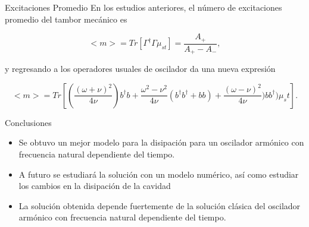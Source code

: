 \documentclass[10pt]{beamer}
\begin{document}
\begin{frame}{Excitaciones Promedio}
En los estudios anteriores, el número de excitaciones promedio del tambor mecánico es

\begin{equation*}
<m> = Tr[\Gamma^\dagger \Gamma \mu_{st}] = \frac{A_+}{A_+ - A_-},
\end{equation*}

y regresando a los operadores usuales de oscilador da una nueva expresión

\begin{equation*}
<m> = Tr[(\frac{(\omega + \nu )^2}{4\nu})b^\dagger b +\frac{\omega^2 - \nu^2}{4\nu}(b^\dagger b^\dagger +bb) +\frac{(\omega - \nu )^2}{4\nu}) b b^\dagger)\mu_st].
\end{equation*}

\end{frame}

\begin{frame}{Conclusiones}

\begin{itemize}
\item Se obtuvo un mejor modelo para la disipación para un oscilador armónico con frecuencia natural dependiente del tiempo.

\item A futuro se estudiará la solución con un modelo numérico, así como estudiar los cambios en la disipación de la cavidad

\item La solución obtenida depende fuertemente de la solución clásica del oscilador armónico con frecuencia natural dependiente del tiempo.
\end{itemize}


\end{frame}
\end{document}
